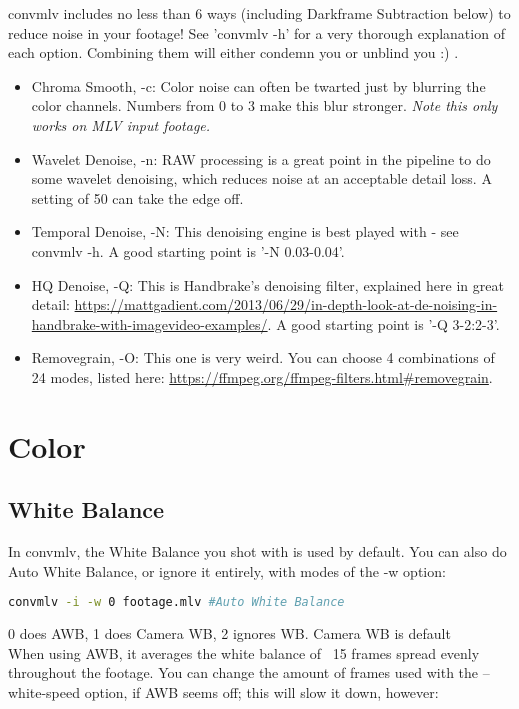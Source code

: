 \documentclass[a4paper,12pt]{article}
\begin{document}
			convmlv includes no less than 6 ways (including Darkframe Subtraction below) to reduce noise in your footage! See 'convmlv -h' for a very thorough explanation of each option.
			Combining them will either condemn you or unblind you :) .
			
			\begin{itemize}
				\item Chroma Smooth, -c: Color noise can often be twarted just by blurring the color channels. Numbers from 0 to 3 make this blur
				stronger. \textit{Note this only works on MLV input footage.}
				\item Wavelet Denoise, -n: RAW processing is a great point in the pipeline to do some wavelet denoising, which reduces
				noise at an acceptable detail loss. A setting of 50 can take the edge off.
				\item Temporal Denoise, -N: This denoising engine is best played with - see convmlv -h. A good starting point is '-N 0.03-0.04'.
				\item HQ Denoise, -Q: This is Handbrake's denoising filter, explained here in great detail:
				\url{https://mattgadient.com/2013/06/29/in-depth-look-at-de-noising-in-handbrake-with-imagevideo-examples/}. A good starting
				point is '-Q 3-2:2-3'.
				\item Removegrain, -O: This one is very weird. You can choose 4 combinations of 24 modes, listed here:
				\url{https://ffmpeg.org/ffmpeg-filters.html#removegrain}.
			\end{itemize}
	
\section{Color}

	\subsection{White Balance}
		In convmlv, the White Balance you shot with is used by default. You can also do Auto White Balance, or ignore it entirely, with modes of the -w option:
	
\begin{lstlisting}[language=bash]
	convmlv -i -w 0 footage.mlv #Auto White Balance
\end{lstlisting}
	
		0 does AWB, 1 does Camera WB, 2 ignores WB. Camera WB is default\\
		
		When using AWB, it averages the white balance of ~15 frames spread evenly
		throughout the footage. You can change the amount of frames used with the --white-speed option, if AWB seems off; this
		will slow it down, however:
	
\end{document}
